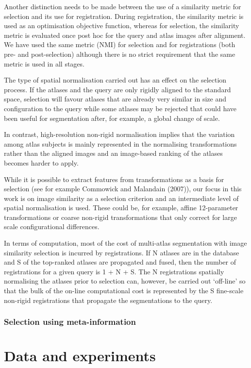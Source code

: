 Another distinction needs to be made between the use of a
similarity metric for selection and its use for registration. During
registration, the similarity metric is used as an optimisation objective
function, whereas for selection, the similarity metric is evaluated once
post hoc for the query and atlas images after alignment. We have used
the same metric (NMI) for selection and for registrations (both pre-
and post-selection) although there is no strict requirement that the
same metric is used in all stages.

The type of spatial normalisation carried out has an effect on the
selection process. If the atlases and the query are only rigidly aligned
to the standard space, selection will favour atlases that are already
very similar in size and configuration to the query while some atlases
may be rejected that could have been useful for segmentation after, for
example, a global change of scale.

In contrast, high-resolution non-rigid normalisation implies that
the variation among atlas subjects is mainly represented in the
normalising transformations rather than the aligned images and an
image-based ranking of the atlases becomes harder to apply.

While it is possible to extract features from transformations as a
basis for selection (see for example Commowick and Malandain
(2007)), our focus in this work is on image similarity as a selection
criterion and an intermediate level of spatial normalisation is used.
These could be, for example, affine 12-parameter transformations or
coarse non-rigid transformations that only correct for large scale
configurational differences.

In terms of computation, most of the cost of multi-atlas segmentation
with image similarity selection is incurred by registrations.
If N atlases are in the database and S of the top-ranked atlases
are propagated and fused,
then the number of registrations for a given query is 1 + N + S.
The N registrations spatially normalising the atlases prior to selection can,
however, be carried out `off-line' so that the bulk of
the on-line computational cost is represented by
the S fine-scale non-rigid registrations
that propagate the segmentations to the query.

\subsubsection*{Selection using meta-information}
\section*{Data and experiments}
